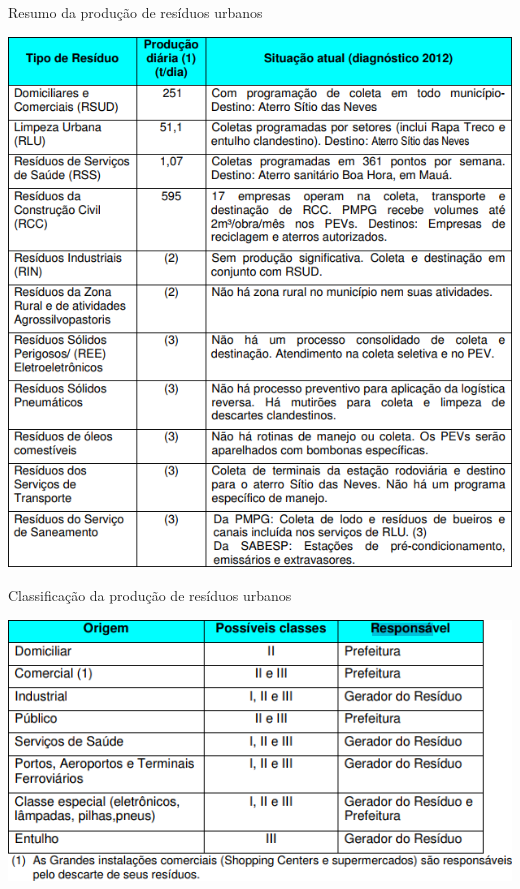 	\begin{table}[!htb]
		\centering
		\caption{Resumo da produção de resíduos urbanos}
		\includegraphics[width=1\textwidth]{img/prod_resid_urbanos.png}
		\label{quadro_prod_resid_urbanos}
	\end{table}
	
	\begin{table}[!htb]
		\centering
		\caption{Classificação da produção de resíduos urbanos}
		\includegraphics[width=1\textwidth]{img/responsa_resid_urbanos.png}
		\label{quadro_responsa_resid_urbanos}
	\end{table}
	
